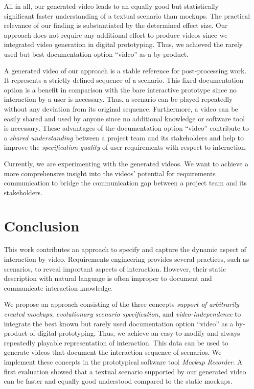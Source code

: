 \documentclass[conference]{IEEEtran}
\begin{document}
All in all, our generated video leads to an equally good but statistically 
significant faster understanding of a textual scenario than mockups. The 
practical relevance of our finding is substantiated by the determined effect 
size. Our approach does not require any additional effort to produce videos 
since we integrated video generation in digital prototyping. Thus, we achieved 
the rarely used but best documentation option ``video'' as a by-product. 

A generated video of our approach is a stable reference for post-processing 
work. It represents a strictly defined sequence of a scenario. This fixed 
documentation option is a benefit in comparison with the bare interactive 
prototype since no interaction by a user is necessary. Thus, a scenario can be 
played repeatedly without any deviation from its original sequence. 
Furthermore, a video can be easily shared and used by anyone since no 
additional knowledge or software tool is necessary. These advantages of the 
documentation option ``video'' contribute to a \textit{shared understanding} 
between a project team and its stakeholders and help to improve the 
\textit{specification quality} of user requirements with respect to interaction.

Currently, we are experimenting with the generated videos. We want to achieve a 
more comprehensive insight into the videos' potential for requirements 
communication to bridge the communication gap between a project team and its 
stakeholders.

\section{Conclusion}
\label{ch:conclusion}
This work contributes an approach to specify and capture the dynamic aspect of 
interaction by video. Requirements engineering provides several practices, such 
as scenarios, to reveal important aspects of interaction. However, their static 
description with natural language is often improper to document and communicate 
interaction knowledge.

We propose an approach consisting of the three concepts \textit{support of 
arbitrarily created mockups}, \textit{evolutionary scenario specification}, and 
\textit{video-independence} to integrate the best known but rarely used 
documentation option ``video'' as a by-product of digital prototyping. Thus, we 
achieve an easy-to-modify and always repeatedly playable representation of 
interaction. This data can be used to generate videos that document the 
interaction sequence of scenarios. We implement these concepts in the 
prototypical software tool \textit{Mockup Recorder}. A first evaluation showed 
that a textual scenario supported by our generated video can be faster and 
equally good understood compared to the static mockups.
\end{document}

